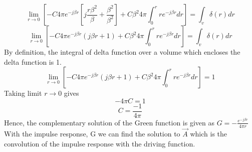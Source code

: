 \begin{dmath*}
\lim\limits_{r\rightarrow0} \left[-C4\pi e^{-j\beta r}\left[j\frac{r\beta^{2}}{\beta} +\frac{\beta^{2}}{\beta^{2}}\right] + C\beta^{2}4\pi\int_{0}^{r}re^{-j\beta r}dr\right] = \int_{v}\delta(r)dr
\end{dmath*}
\begin{dmath*}
\lim\limits_{r\rightarrow0} \left[-C4\pi e^{-j\beta r}(j\beta r+1) + C\beta^{2}4\pi\int_{0}^{r}re^{-j\beta r}dr\right] = \int_{v}\delta(r)dr
\end{dmath*}
By definition, the integral of delta function over a volume which encloses the delta function is 1.
$$\lim\limits_{r\rightarrow0} \left[-C4\pi e^{-j\beta r}(j\beta r+1) + C\beta^{2}4\pi\int_{0}^{r}re^{-j\beta r}dr\right] = 1$$
Taking limit $r\rightarrow0$ gives
$$-4\pi C= 1$$
$$C = \frac{-1}{4\pi}$$
Hence, the complementary solution of the Green function is given as $ G= -\frac{e^{-j\beta r}}{4\pi r}$
With the impulse response, G we can find the solution to $\vec{A}$ which is the convolution of the impulse response with the driving function.

